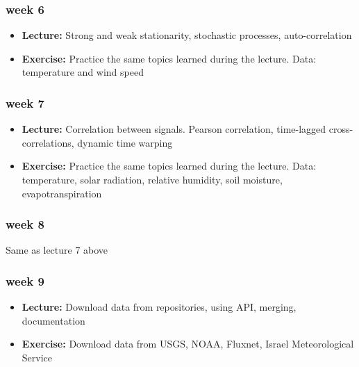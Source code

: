 \documentclass[
  letterpaper,
  DIV=11,
  numbers=noendperiod,
  oneside]{scrreprt}
\providecommand{\tightlist}{%
  \setlength{\itemsep}{0pt}\setlength{\parskip}{0pt}}\usepackage{longtable,booktabs,array}
\begin{document}
\hypertarget{week-6}{%
\subsubsection*{week 6}\label{week-6}}

\begin{itemize}
\tightlist
\item
  \textbf{Lecture:} Strong and weak stationarity, stochastic processes,
  auto-correlation
\item
  \textbf{Exercise:} Practice the same topics learned during the
  lecture. Data: temperature and wind speed
\end{itemize}

\hypertarget{week-7}{%
\subsubsection*{week 7}\label{week-7}}

\begin{itemize}
\tightlist
\item
  \textbf{Lecture:} Correlation between signals. Pearson correlation,
  time-lagged cross-correlations, dynamic time warping
\item
  \textbf{Exercise:} Practice the same topics learned during the
  lecture. Data: temperature, solar radiation, relative humidity, soil
  moisture, evapotranspiration
\end{itemize}

\hypertarget{week-8}{%
\subsubsection*{week 8}\label{week-8}}

Same as lecture 7 above

\hypertarget{week-9}{%
\subsubsection*{week 9}\label{week-9}}

\begin{itemize}
\tightlist
\item
  \textbf{Lecture:} Download data from repositories, using API, merging,
  documentation
\item
  \textbf{Exercise:} Download data from USGS, NOAA, Fluxnet, Israel
  Meteorological Service
\end{itemize}
\end{document}
